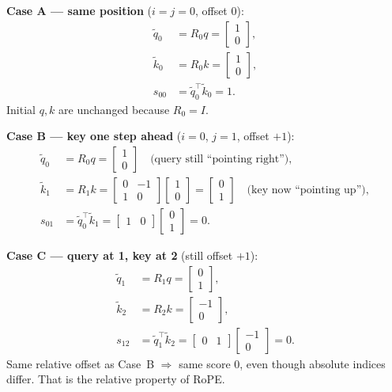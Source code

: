 \documentclass[11pt]{article}
\begin{document}
\textbf{Case A --- same position} (\(i=j=0\), offset \(0\)):
\begin{align*}
  \tilde{q}_0 &= R_0 q = \begin{bmatrix}1\\0\end{bmatrix}, \\
  \tilde{k}_0 &= R_0 k = \begin{bmatrix}1\\0\end{bmatrix}, \\
  s_{00}
    &= \tilde{q}_0^\top \tilde{k}_0
     = 1.
\end{align*}
Initial \(q,k\) are unchanged because \(R_0=I\).

\textbf{Case B --- key one step ahead} (\(i=0\), \(j=1\), offset \(+1\)):
\begin{align*}
  \tilde{q}_0 &= R_0 q = \begin{bmatrix}1\\0\end{bmatrix}
  \quad\text{(query still ``pointing right'')}, \\
  \tilde{k}_1 &= R_1 k
               = \begin{bmatrix}0&-1\\1&0\end{bmatrix}
                 \begin{bmatrix}1\\0\end{bmatrix}
               = \begin{bmatrix}0\\1\end{bmatrix}
  \quad\text{(key now ``pointing up'')}, \\
  s_{01}
    &= \tilde{q}_0^\top \tilde{k}_1
     = \begin{bmatrix}1&0\end{bmatrix}\begin{bmatrix}0\\1\end{bmatrix}
     = 0.
\end{align*}

\textbf{Case C --- query at 1, key at 2} (still offset \(+1\)):
\begin{align*}
  \tilde{q}_1 &= R_1 q = \begin{bmatrix}0\\1\end{bmatrix}, \\
  \tilde{k}_2 &= R_2 k = \begin{bmatrix}-1\\0\end{bmatrix}, \\
  s_{12}
    &= \tilde{q}_1^\top \tilde{k}_2
     = \begin{bmatrix}0&1\end{bmatrix}\begin{bmatrix}-1\\0\end{bmatrix}
     = 0.
\end{align*}
Same relative offset as Case~B \(\Rightarrow\) same score \(0\), even though
absolute indices differ. That is the relative property of RoPE.
\end{document}
